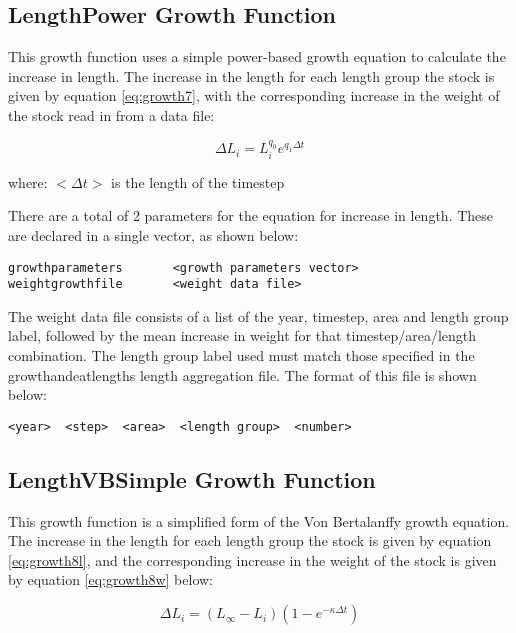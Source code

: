 \documentclass[]{book}
\begin{document}
\hypertarget{subsec:growth7}{%
\subsection{LengthPower Growth Function}\label{subsec:growth7}}

This growth function uses a simple power-based growth equation to
calculate the increase in length. The increase in the length for each
length group the stock is given by
equation \eqref{eq:growth7}, with the corresponding increase in the weight
of the stock read in from a data file:

\begin{equation}
\label{eq:growth7}
\Delta L_{i} = L_{i}^{q_{0}} e^{q_{1} \Delta t}\end{equation}

where: \(<\Delta t>\) is the length of the timestep

There are a total of 2 parameters for the equation for increase in
length. These are declared in a single vector, as shown below:

\begin{verbatim}
growthparameters       <growth parameters vector>
weightgrowthfile       <weight data file>
\end{verbatim}

The weight data file consists of a list of the year, timestep, area and
length group label, followed by the mean increase in weight for that
timestep/area/length combination. The length group label used must match
those specified in the growthandeatlengths length aggregation file. The
format of this file is shown below:

\begin{verbatim}
<year>  <step>  <area>  <length group>  <number>
\end{verbatim}

\hypertarget{subsec:growth8}{%
\subsection{LengthVBSimple Growth Function}\label{subsec:growth8}}

This growth function is a simplified form of the Von Bertalanffy growth
equation. The increase in the length for each length group the stock is
given by equation \eqref{eq:growth8l}, and the corresponding increase in the weight
of the stock is given by
equation \eqref{eq:growth8w} below:

\begin{equation}
\label{eq:growth8l}
\Delta L_{i} = \left( L_{\infty} - L_{i} \right) \left( 1 - e^{-\kappa \Delta t} \right)\end{equation}
\end{document}
